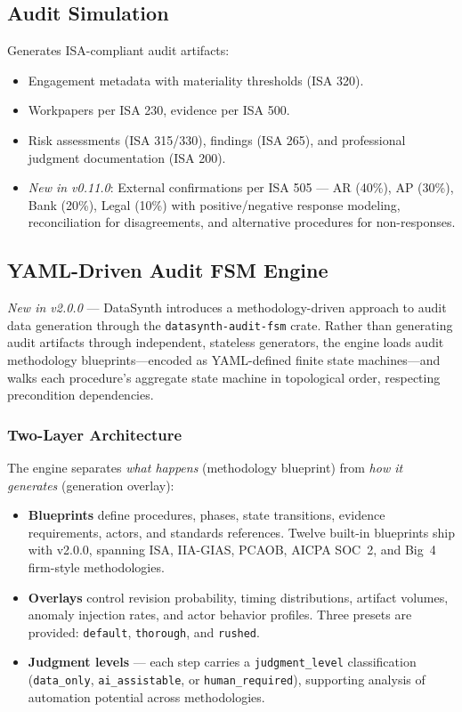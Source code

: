 \documentclass[11pt,a4paper]{article}
\begin{document}
\subsection{Audit Simulation}

Generates ISA-compliant audit artifacts:

\begin{itemize}[leftmargin=1.4em, itemsep=2pt]
  \item Engagement metadata with materiality thresholds (ISA 320).
  \item Workpapers per ISA 230, evidence per ISA 500.
  \item Risk assessments (ISA 315/330), findings (ISA 265), and
        professional judgment documentation (ISA 200).
  \item \textit{New in v0.11.0}: External confirmations per ISA 505 --- AR (40\%),
        AP (30\%), Bank (20\%), Legal (10\%) with positive/negative response
        modeling, reconciliation for disagreements, and alternative procedures
        for non-responses.
\end{itemize}

\subsection{YAML-Driven Audit FSM Engine}

\textit{New in v2.0.0} --- DataSynth introduces a methodology-driven approach to audit data
generation through the \texttt{datasynth-audit-fsm} crate. Rather than
generating audit artifacts through independent, stateless generators, the
engine loads audit methodology blueprints---encoded as YAML-defined finite
state machines---and walks each procedure's aggregate state machine in
topological order, respecting precondition dependencies.

\subsubsection{Two-Layer Architecture}

The engine separates \emph{what happens} (methodology blueprint) from
\emph{how it generates} (generation overlay):

\begin{itemize}[leftmargin=1.2em, itemsep=3pt]
  \item \textbf{Blueprints} define procedures, phases, state transitions,
        evidence requirements, actors, and standards references. Twelve
        built-in blueprints ship with v2.0.0, spanning ISA, IIA-GIAS,
        PCAOB, AICPA SOC~2, and Big~4 firm-style methodologies.
  \item \textbf{Overlays} control revision probability, timing distributions,
        artifact volumes, anomaly injection rates, and actor behavior profiles.
        Three presets are provided: \texttt{default}, \texttt{thorough}, and
        \texttt{rushed}.
  \item \textbf{Judgment levels} --- each step carries a
        \texttt{judgment\_level} classification (\texttt{data\_only},
        \texttt{ai\_assistable}, or \texttt{human\_required}), supporting
        analysis of automation potential across methodologies.
\end{itemize}
\end{document}

